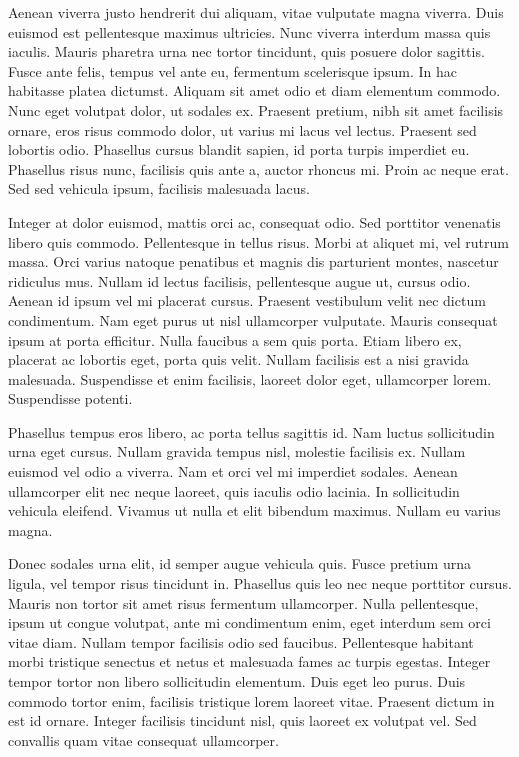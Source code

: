 \documentclass{book}
\begin{document}
            Aenean viverra justo hendrerit dui aliquam, vitae vulputate magna viverra. Duis
               euismod est pellentesque maximus ultricies. Nunc viverra interdum massa quis iaculis.
               Mauris pharetra urna nec tortor tincidunt, quis posuere dolor sagittis. Fusce ante
               felis, tempus vel ante eu, fermentum scelerisque ipsum. In hac habitasse platea
               dictumst. Aliquam sit amet odio et diam elementum commodo. Nunc eget volutpat dolor,
               ut sodales ex. Praesent pretium, nibh sit amet facilisis ornare, eros risus commodo
               dolor, ut varius mi lacus vel lectus. Praesent sed lobortis odio. Phasellus cursus
               blandit sapien, id porta turpis imperdiet eu. Phasellus risus nunc, facilisis quis
               ante a, auctor rhoncus mi. Proin ac neque erat. Sed sed vehicula ipsum, facilisis
               malesuada lacus.

            Integer at dolor euismod, mattis orci ac, consequat odio. Sed porttitor venenatis
               libero quis commodo. Pellentesque in tellus risus. Morbi at aliquet mi, vel rutrum
               massa. Orci varius natoque penatibus et magnis dis parturient montes, nascetur
               ridiculus mus. Nullam id lectus facilisis, pellentesque augue ut, cursus odio. Aenean
               id ipsum vel mi placerat cursus. Praesent vestibulum velit nec dictum condimentum.
               Nam eget purus ut nisl ullamcorper vulputate. Mauris consequat ipsum at porta
               efficitur. Nulla faucibus a sem quis porta. Etiam libero ex, placerat ac lobortis
               eget, porta quis velit. Nullam facilisis est a nisi gravida malesuada. Suspendisse et
               enim facilisis, laoreet dolor eget, ullamcorper lorem. Suspendisse potenti.

            Phasellus tempus eros libero, ac porta tellus sagittis id. Nam luctus sollicitudin
               urna eget cursus. Nullam gravida tempus nisl, molestie facilisis ex. Nullam euismod
               vel odio a viverra. Nam et orci vel mi imperdiet sodales. Aenean ullamcorper elit nec
               neque laoreet, quis iaculis odio lacinia. In sollicitudin vehicula eleifend. Vivamus
               ut nulla et elit bibendum maximus. Nullam eu varius magna.

            Donec sodales urna elit, id semper augue vehicula quis. Fusce pretium urna ligula,
               vel tempor risus tincidunt in. Phasellus quis leo nec neque porttitor cursus. Mauris
               non tortor sit amet risus fermentum ullamcorper. Nulla pellentesque, ipsum ut congue
               volutpat, ante mi condimentum enim, eget interdum sem orci vitae diam. Nullam tempor
               facilisis odio sed faucibus. Pellentesque habitant morbi tristique senectus et netus
               et malesuada fames ac turpis egestas. Integer tempor tortor non libero sollicitudin
               elementum. Duis eget leo purus. Duis commodo tortor enim, facilisis tristique lorem
               laoreet vitae. Praesent dictum in est id ornare. Integer facilisis tincidunt nisl,
               quis laoreet ex volutpat vel. Sed convallis quam vitae consequat ullamcorper.
\end{document}
